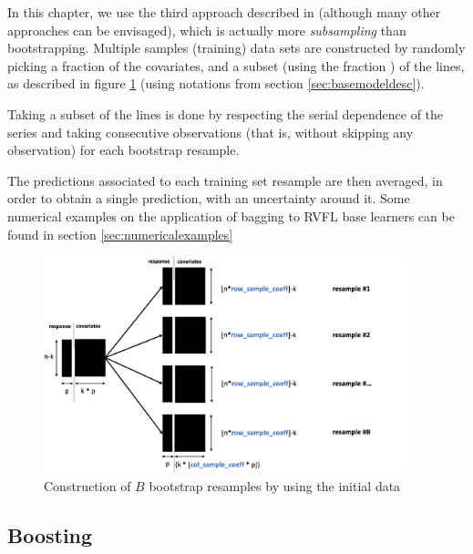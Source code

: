 \medskip

In this chapter, we use the third approach described in \cite{rosen1996ensemble}  (although many other approaches can be envisaged),  which is actually more \textit{subsampling} than bootstrapping. Multiple samples (training) data sets are constructed by randomly picking a fraction  of the covariates, and a subset (using the fraction ) of the lines, as described in figure \ref{bootstrap_resampling_plot} (using notations from section \ref{sec:basemodeldesc}). 

Taking a subset of the lines is done by respecting the serial dependence of the series and taking consecutive observations (that is, without skipping any observation) for each bootstrap resample. 

The predictions associated to each training set resample are then averaged, in order to obtain a single prediction, with an uncertainty around it. Some numerical examples on the application of bagging to RVFL base learners can be found in section \ref{sec:numericalexamples}

\begin{figure}[!htb]
\centering
\includegraphics[width=10.5cm]{gfx/chapter-rvfl-ensembles/bootstrap_resampling.png}
\caption{Construction of $B$ bootstrap resamples by using the initial data}
\label{bootstrap_resampling_plot}
\end{figure}

\newpage

\subsection{Boosting}
\label{sec:rvflboosting}

